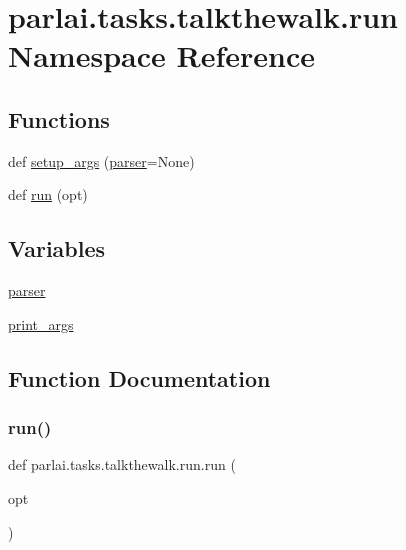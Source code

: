 \hypertarget{namespaceparlai_1_1tasks_1_1talkthewalk_1_1run}{}\section{parlai.\+tasks.\+talkthewalk.\+run Namespace Reference}
\label{namespaceparlai_1_1tasks_1_1talkthewalk_1_1run}
\subsection*{Functions}
\begin{DoxyCompactItemize}
\item 
def \hyperlink{namespaceparlai_1_1tasks_1_1talkthewalk_1_1run_a3534e8afa0a4dc25a6e02740fa35ac84}{setup\+\_\+args} (\hyperlink{namespaceparlai_1_1tasks_1_1talkthewalk_1_1run_a6ddc3f1bb5ff1ce0a0b25bb1abfd2251}{parser}=None)
\item 
def \hyperlink{namespaceparlai_1_1tasks_1_1talkthewalk_1_1run_a0a1ec08b8196cb008e4df83468c67e5b}{run} (opt)
\end{DoxyCompactItemize}
\subsection*{Variables}
\begin{DoxyCompactItemize}
\item 
\hyperlink{namespaceparlai_1_1tasks_1_1talkthewalk_1_1run_a6ddc3f1bb5ff1ce0a0b25bb1abfd2251}{parser}
\item 
\hyperlink{namespaceparlai_1_1tasks_1_1talkthewalk_1_1run_aaaa6dd17c737d50be241dc6844bfc581}{print\+\_\+args}
\end{DoxyCompactItemize}


\subsection{Function Documentation}
\mbox{\label{namespaceparlai_1_1tasks_1_1talkthewalk_1_1run_a0a1ec08b8196cb008e4df83468c67e5b}} 
\subsubsection{\texorpdfstring{run()}{run()}}
{\footnotesize\ttfamily def parlai.\+tasks.\+talkthewalk.\+run.\+run (\begin{DoxyParamCaption}\item[{}]{opt }\end{DoxyParamCaption})}



